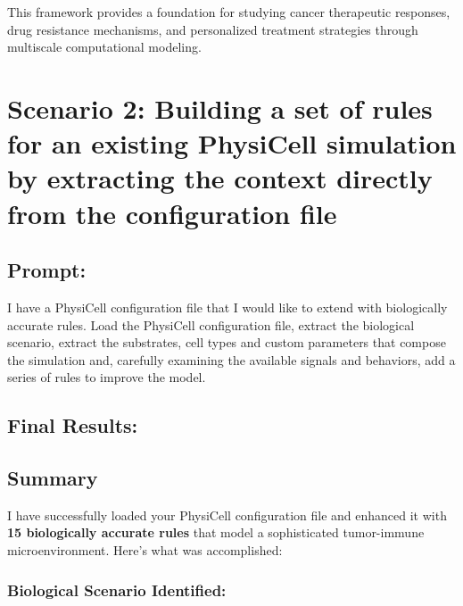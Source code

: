 This framework provides a foundation for studying cancer therapeutic
responses, drug resistance mechanisms, and personalized treatment
strategies through multiscale computational modeling.

\hypertarget{scenario-2-building-a-set-of-rules-for-an-existing-physicell-simulation-by-extracting-the-context-directly-from-the-configuration-file}{%
\section{Scenario 2: Building a set of rules for an existing PhysiCell
simulation by extracting the context directly from the configuration
file}\label{scenario-2-building-a-set-of-rules-for-an-existing-physicell-simulation-by-extracting-the-context-directly-from-the-configuration-file}}

\hypertarget{prompt-1}{%
\subsection{Prompt:}\label{prompt-1}}

I have a PhysiCell configuration file that I would like to extend with
biologically accurate rules. Load the PhysiCell configuration file,
extract the biological scenario, extract the substrates, cell types and
custom parameters that compose the simulation and, carefully examining
the available signals and behaviors, add a series of rules to improve
the model.

\hypertarget{final-results-1}{%
\subsection{Final Results:}\label{final-results-1}}

\hypertarget{summary}{%
\subsection{Summary}\label{summary}}

I have successfully loaded your PhysiCell configuration file and
enhanced it with \textbf{15 biologically accurate rules} that model a
sophisticated tumor-immune microenvironment. Here's what was
accomplished:

\hypertarget{biological-scenario-identified}{%
\subsubsection{\texorpdfstring{\textbf{Biological Scenario
Identified:}}{Biological Scenario Identified:}}\label{biological-scenario-identified}}

